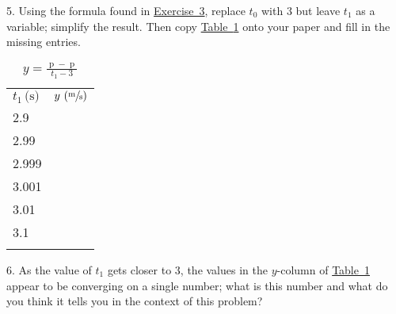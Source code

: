 \documentclass[12pt,]{book}
\theoremstyle{plain}
\theoremstyle{definition}
\numberwithin{equation}{section}
\newcommand{\hrulemedium}{\noalign{\hrule height 0.07em}}
\newcommand{\hrulethick} {\noalign{\hrule height 0.11em}}
\providecommand\phantomsection{}
\newcommand{\fe}[2]{\mathop{{#1}{\left(#2\right)}}}
\begin{document}
\begin{exerciselist}
\item[5.]\phantomsection\hypertarget{exercise-5}{\null}Using the formula found in \hyperref[exercise-average-velocity-formula]{Exercise~3}, replace \(t_0\) with \(3\) but leave \(t_1\) as a variable; simplify the result. Then copy \hyperref[table-velocity]{Table~\ref*{table-velocity}} onto your paper and fill in the missing entries.%
\begin{table}
\centering
\caption{\(y=\frac{\fe{p}{t_1}-\fe{p}{3}}{t_1-3}\)\label{table-velocity}}
\begin{tabular}{lc}\hrulethick
\(t_1\,\text{(s)}\)&\(y\,\left(\sfrac{\text{m}}{\text{s}}\right)\)\\\hrulemedium
2.9&\\
2.99&\\
2.999&\\
3.001&\\
3.01&\\
3.1&\\\hrulethick
\end{tabular}
\end{table}
\par\smallskip
\item[6.]\phantomsection\hypertarget{exercise-6}{\null}As the value of \(t_1\) gets closer to \(3\), the values in the \(y\)-column of \hyperref[table-velocity]{Table~\ref*{table-velocity}} appear to be converging on a single number; what is this number and what do you think it tells you in the context of this problem?%
\par\smallskip
\end{exerciselist}
\typeout{************************************************}
\typeout{************************************************}
\end{document}
